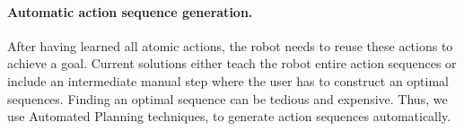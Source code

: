 \paragraph{Automatic action sequence generation.}
After having learned all atomic actions, the robot needs to reuse these actions to achieve a goal.
Current solutions either teach the robot entire action sequences or include an intermediate manual step where the user has to construct an optimal sequences.
Finding an optimal sequence can be tedious and expensive.
Thus, we use Automated Planning techniques, to generate action sequences automatically.

